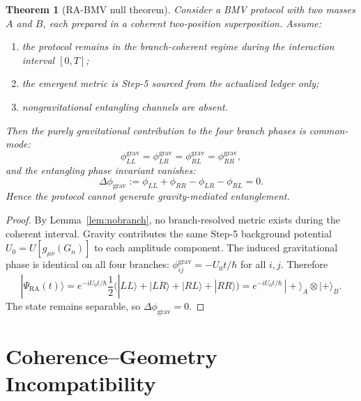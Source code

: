 \documentclass[12pt,a4paper]{article}
\newtheorem{theorem}{Theorem}[section]
\begin{document}
\begin{theorem}[RA-BMV null theorem]
\label{thm:null}
Consider a BMV protocol with two masses $A$ and $B$, each prepared
in a coherent two-position superposition. Assume:
\begin{enumerate}[nosep]
\item the protocol remains in the branch-coherent regime during the
interaction interval $[0,T]$;
\item the emergent metric is Step-5 sourced from the actualized
ledger only;
\item nongravitational entangling channels are absent.
\end{enumerate}
Then the purely gravitational contribution to the four branch phases
is common-mode:
\begin{equation}
\phi^{\mathrm{grav}}_{LL}
= \phi^{\mathrm{grav}}_{LR}
= \phi^{\mathrm{grav}}_{RL}
= \phi^{\mathrm{grav}}_{RR},
\end{equation}
and the entangling phase invariant vanishes:
\begin{equation}
\boxed{\Delta\phi_{\mathrm{grav}} := \phi_{LL} + \phi_{RR}
- \phi_{LR} - \phi_{RL} = 0.}
\end{equation}
Hence the protocol cannot generate gravity-mediated entanglement.
\end{theorem}

\begin{proof}
By Lemma~\ref{lem:nobranch}, no branch-resolved metric exists during
the coherent interval. Gravity contributes the same Step-5 background
potential $U_0 = U[g_{\mu\nu}(G_n)]$ to each amplitude component.
The induced gravitational phase is identical on all four branches:
$\phi_{ij}^{\mathrm{grav}} = -U_0 t/\hbar$ for all $i,j$. Therefore
\begin{equation}
|\Psi_{\mathrm{RA}}(t)\rangle
= e^{-iU_0 t/\hbar}
\frac{1}{2}\bigl(|LL\rangle + |LR\rangle + |RL\rangle
+ |RR\rangle\bigr)
= e^{-iU_0 t/\hbar}\,|{+}\rangle_A \otimes |{+}\rangle_B.
\end{equation}
The state remains separable, so $\Delta\phi_{\mathrm{grav}} = 0$.
\end{proof}

\section{Coherence--Geometry Incompatibility}
\label{sec:incompatibility}
\end{document}
